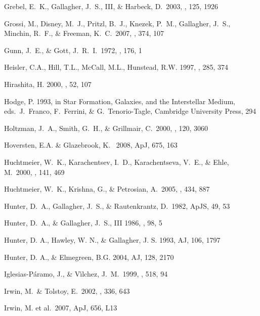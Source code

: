 \documentclass[12pt,preprint]{emulateapj}
\begin{document}
\begin{thebibliography}{}
Grebel, E.~K., Gallagher, J.~S., III, \& Harbeck, D.\ 2003, \aj, 125, 1926

Grossi, M., Disney, M.~J., Pritzl, B.~J., Knezek, P.~M., Gallagher, J.~S., 
    Minchin, R.~F., \& Freeman, K.~C.\ 2007, \mnras, 374, 107 

Gunn, J.~E., \& Gott, J.~R.~I.\ 1972, \apj, 176, 1 

Heisler, C.A., Hill, T.L., McCall, M.L., Hunstead, R.W. 1997, \mnras , 285, 374

Hirashita, H. 2000, \pasj , 52, 107

Hodge, P. 1993, in Star Formation, Galaxies, and the Interstellar Medium,
   eds.\ J.\ Franco, F.\ Ferrini, \& G.\ Tenorio-Tagle, Cambridge University 
   Press, 294

Holtzman, J.~A., Smith, G.~H., \& Grillmair, C.\ 2000, \aj, 120, 3060 

Hoversten, E.A. \& Glazebrook, K. \ 2008, ApJ, 675, 163 

Huchtmeier, W.~K., Karachentsev, I.~D., Karachentseva, V.~E., \& 
   Ehle, M.\ 2000, \aaps, 141, 469 

Huchtmeier, W.~K., Krishna, G., \& Petrosian, A.\ 2005, \aap, 434, 887 

Hunter, D.~A., Gallagher, J.~S., \& Rautenkrantz, D.\ 1982, ApJS, 49, 53

Hunter, D.~A., \& Gallagher, J.~S., III 1986, \pasp, 98, 5 

Hunter, D. A., Hawley, W. N., \& Gallagher, J. S. 1993, AJ, 106, 1797

Hunter, D. A., \& Elmegreen, B.G. 2004, AJ, 128, 2170

Iglesias-P{\'a}ramo, J., \& V{\'{\i}}lchez, J.~M.\ 1999, \apj, 518, 94 

Irwin, M.~\& Tolstoy, E.\ 2002, \mnras, 336, 643 

Irwin, M. et al.\ 2007, ApJ, 656, L13 


\end{thebibliography}
\end{document}
